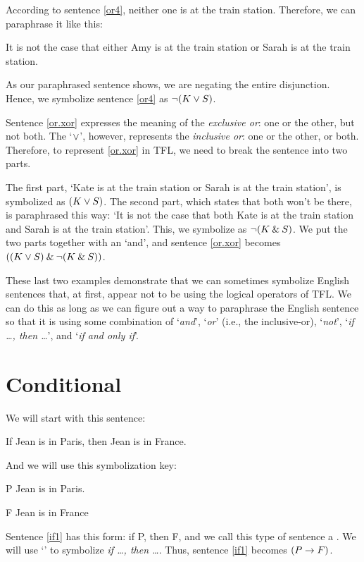 According to sentence \ref{or4}, neither one is at the train station. Therefore, we can paraphrase it like this:
\begin{ebullet}
	\item[] It is not the case that either Amy is at the train station or Sarah is at the train station. 
\end{ebullet}
As our paraphrased sentence shows, we are negating the entire disjunction. Hence, we symbolize sentence \ref{or4} as ${\neg} (K \vee S)$. 

Sentence \ref{or.xor} expresses the meaning of the \textit{exclusive or}: one or the other, but not both. The `$\vee$', however, represents the \textit{inclusive or}: one or the other, or both. Therefore, to represent \ref{or.xor} in TFL, we need to break the sentence into two parts. 

The first part, `Kate is at the train station or Sarah is at the train station', is symbolized as $(K \vee S)$. The second part, which states that both won't be there, is paraphrased this way: `It is not the case that both Kate is at the train station and Sarah is at the train station'. This, we symbolize as ${\neg}(K \mathbin{\&} S)$. We put the two parts together with an `and', and sentence \ref{or.xor} becomes $((K \vee S) \mathbin{\&}  {\neg}(K \mathbin{\&} S))$.

These last two examples demonstrate that we can sometimes symbolize English sentences that, at first, appear not to be using the logical operators of TFL. We can do this as long as we can figure out a way to paraphrase the English sentence so that it is using some combination of `\textit{and}', `\textit{or}' (i.e., the inclusive-or), `\textit{not}', `\textit{if \ldots, then \ldots}', and `\textit{if and only if}'. 


\section{Conditional}

We will start with this sentence:
	\begin{earg}
		\item[\ex{if1}] If Jean is in Paris, then Jean is in France.
	\end{earg}
And we will use this symbolization key:
	\begin{ekey}
		\item[P] Jean is in Paris.
		\item[F] Jean is in France
	\end{ekey}
Sentence \ref{if1} has this form: if P, then F, and we call this type of sentence a . We will use `\eif' to symbolize \textit{if \ldots, then \ldots}. Thus, sentence \ref{if1} becomes $(P\rightarrow F)$. 

